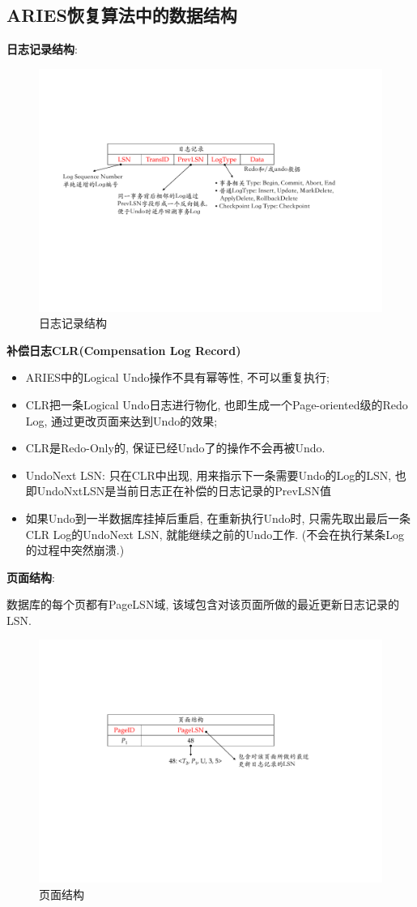 \subsection{ARIES恢复算法中的数据结构}

\textbf{日志记录结构}:
\begin{figure}[H]
    \centering
    \includegraphics[width=.9\textwidth]{figure/日志记录结构.pdf}
    \caption{日志记录结构}
\end{figure}

\textbf{补偿日志CLR(Compensation Log Record)}
\begin{itemize}
    \item ARIES中的Logical Undo操作不具有幂等性, 不可以重复执行;
    \item CLR把一条Logical Undo日志进行物化, 也即生成一个Page-oriented级的Redo Log, 通过更改页面来达到Undo的效果;
    \item CLR是Redo-Only的, 保证已经Undo了的操作不会再被Undo.
    \item UndoNext LSN: 只在CLR中出现, 用来指示下一条需要Undo的Log的LSN, 也即UndoNxtLSN是当前日志正在补偿的日志记录的PrevLSN值
    \item 如果Undo到一半数据库挂掉后重启, 在重新执行Undo时, 只需先取出最后一条CLR Log的UndoNext LSN, 就能继续之前的Undo工作. (不会在执行某条Log的过程中突然崩溃.)
\end{itemize}

\textbf{页面结构}:

数据库的每个页都有PageLSN域, 该域包含对该页面所做的最近更新日志记录的LSN.
\begin{figure}[H]
    \centering
    \includegraphics[width=.7\textwidth]{figure/页面结构.pdf}
    \caption{页面结构}
\end{figure}

